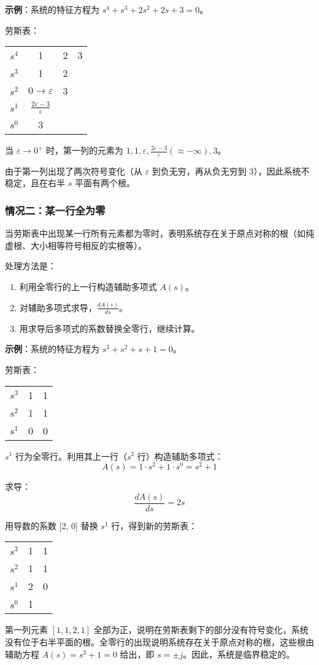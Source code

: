 \textbf{示例}：系统的特征方程为 $s^4 + s^3 + 2s^2 + 2s + 3 = 0$。

劳斯表：
\begin{center}
\begin{tabular}{c|ccc}
$s^4$ & 1 & 2 & 3 \\
$s^3$ & 1 & 2 & \\
$s^2$ & $0 \to \varepsilon$ & 3 & \\
$s^1$ & $\frac{2\varepsilon - 3}{\varepsilon}$ & & \\
$s^0$ & 3 & &
\end{tabular}
\end{center}

当 $\varepsilon \to 0^+$ 时，第一列的元素为 $1, 1, \varepsilon, \frac{2\varepsilon - 3}{\varepsilon} (\approx -\infty), 3$。

由于第一列出现了两次符号变化（从 $\varepsilon$ 到负无穷，再从负无穷到 3），因此系统不稳定，且在右半 $s$ 平面有两个根。

\subsubsection{情况二：某一行全为零}
当劳斯表中出现某一行所有元素都为零时，表明系统存在关于原点对称的根（如纯虚根、大小相等符号相反的实根等）。

处理方法是：
\begin{enumerate}
    \item 利用全零行的上一行构造辅助多项式 $A(s)$。
    \item 对辅助多项式求导，$\frac{dA(s)}{ds}$。
    \item 用求导后多项式的系数替换全零行，继续计算。
\end{enumerate}

\textbf{示例}：系统的特征方程为 $s^3 + s^2 + s + 1 = 0$。

劳斯表：
\begin{center}
\begin{tabular}{c|cc}
$s^3$ & 1 & 1 \\
$s^2$ & 1 & 1 \\
$s^1$ & 0 & 0
\end{tabular}
\end{center}

$s^1$ 行为全零行。利用其上一行（$s^2$ 行）构造辅助多项式：
\[A(s) = 1 \cdot s^2 + 1 \cdot s^0 = s^2 + 1\]

求导：
\[\frac{dA(s)}{ds} = 2s\]

用导数的系数 [2, 0] 替换 $s^1$ 行，得到新的劳斯表：
\begin{center}
\begin{tabular}{c|cc}
$s^3$ & 1 & 1 \\
$s^2$ & 1 & 1 \\
$s^1$ & 2 & 0 \\
$s^0$ & 1 & 
\end{tabular}
\end{center}

第一列元素 $[1, 1, 2, 1]$ 全部为正，说明在劳斯表剩下的部分没有符号变化，系统没有位于右半平面的根。全零行的出现说明系统存在关于原点对称的根，这些根由辅助方程 $A(s) = s^2 + 1 = 0$ 给出，即 $s = \pm j$。因此，系统是临界稳定的。
